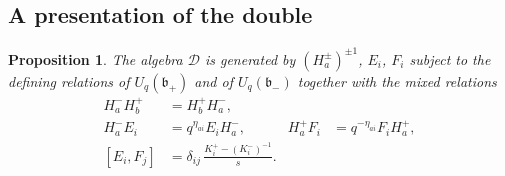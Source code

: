 \documentclass[12pt]{article}
\newtheorem{proposition}[theorem]{Proposition}
\theoremstyle{remark}
\newcommand{\U}{U_q}
\newcommand{\bp}{\mathfrak b_+}
\newcommand{\bm}{\mathfrak b_-}
\newcommand{\cD}{\mathcal D}
\begin{document}
\subsection{A presentation of the double}

\begin{proposition}\label{prop:double}
The algebra $\cD$ is generated by $(H^\pm_a)^{\pm1}$, $E_i$, $F_i$
subject to the defining relations of $\U(\bp)$ and of $\U(\bm)$ together
with the mixed relations
\begin{align}
 H^-_aH^+_b&=H^+_bH^-_a, \label{eq:doubletorus}\\
 H^-_aE_i&=q^{\eta_{ai}}E_iH^-_a,
       & H^+_aF_i&=q^{-\eta_{ai}}F_iH^+_a, \label{eq:doubleweights}\\
 [E_i,F_j]&=\delta_{ij}\,\frac{K^+_i-(K^-_i)^{-1}}s. \label{eq:doubleEF}
\end{align}
\end{proposition}
\end{document}
